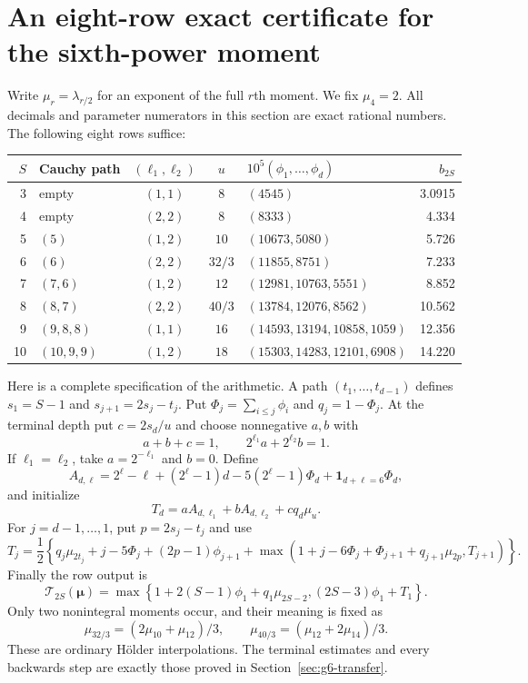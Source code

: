 \documentclass[11pt,reqno]{amsart}
\numberwithin{equation}{section}
\theoremstyle{definition}
\begin{document}
\section{An eight-row exact certificate for the sixth-power moment}
\label{sec:g6-certificate}

Write $\mu_r=\lambda_{r/2}$ for an exponent of the full $r$th moment.
We fix $\mu_4=2$. All decimals and parameter numerators in this section
are exact rational numbers. The following eight rows suffice:
\begin{center}
\small
\begin{tabular}{@{}r l c c l r@{}}
\toprule
$S$ & Cauchy path & $(\ell_1,\ell_2)$ & $u$ & $10^5(\phi_1,\ldots,\phi_d)$ & $b_{2S}$\\
\midrule
3 & empty & $(1,1)$ & $8$ & $(4545)$ & 3.0915\\
4 & empty & $(2,2)$ & $8$ & $(8333)$ & 4.334\\
5 & $(5)$ & $(1,2)$ & $10$ & $(10673,5080)$ & 5.726\\
6 & $(6)$ & $(2,2)$ & $32/3$ & $(11855,8751)$ & 7.233\\
7 & $(7,6)$ & $(1,2)$ & $12$ & $(12981,10763,5551)$ & 8.852\\
8 & $(8,7)$ & $(2,2)$ & $40/3$ & $(13784,12076,8562)$ & 10.562\\
9 & $(9,8,8)$ & $(1,1)$ & $16$ & $(14593,13194,10858,1059)$ & 12.356\\
10 & $(10,9,9)$ & $(1,2)$ & $18$ & $(15303,14283,12101,6908)$ & 14.220\\
\bottomrule
\end{tabular}
\end{center}

Here is a complete specification of the arithmetic. A path $(t_1,\ldots,t_{d-1})$
defines $s_1=S-1$ and $s_{j+1}=2s_j-t_j$. Put
$\Phi_j=\sum_{i\le j}\phi_i$ and $q_j=1-\Phi_j$.
At the terminal depth put $c=2s_d/u$ and choose nonnegative $a,b$ with
\[
 a+b+c=1,\qquad 2^{\ell_1}a+2^{\ell_2}b=1.
\]
If $\ell_1=\ell_2$, take $a=2^{-\ell_1}$ and $b=0$.
Define
\[
 A_{d,\ell}=2^\ell-\ell+(2^\ell-1)d
       -5(2^\ell-1)\Phi_d+\mathbf1_{d+\ell=6}\Phi_d,
\]
and initialize
\[
 T_d=aA_{d,\ell_1}+bA_{d,\ell_2}+cq_d\mu_u.
\]
For $j=d-1,\ldots,1$, put $p=2s_j-t_j$ and use
\[
 T_j=\frac12\left\{q_j\mu_{2t_j}+j-5\Phi_j+(2p-1)\phi_{j+1}
 +\max\left(1+j-6\Phi_j+\Phi_{j+1}+q_{j+1}\mu_{2p},T_{j+1}\right)\right\}.
\]
Finally the row output is
\[
 \mathcal T_{2S}(\boldsymbol\mu)=
 \max\left\{1+2(S-1)\phi_1+q_1\mu_{2S-2},
                         (2S-3)\phi_1+T_1\right\}.
\]
Only two nonintegral moments occur, and their meaning is fixed as
\[
 \mu_{32/3}=(2\mu_{10}+\mu_{12})/3,
 \qquad \mu_{40/3}=(\mu_{12}+2\mu_{14})/3.
\]
These are ordinary H\"older interpolations. The terminal estimates and every
backwards step are exactly those proved in Section~\ref{sec:g6-transfer}.
\end{document}
